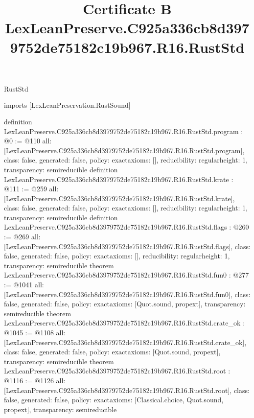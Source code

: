 \begin{lexlean}{RustStd}
\title{Certificate B LexLeanPreserve.C925a336cb8d3979752de75182c19b967.R16.RustStd}
\begin{coremodule}
imports [LexLeanPreservation.RustSound]

definition LexLeanPreserve.C925a336cb8d3979752de75182c19b967.R16.RustStd.program : @0 := @110 {
  all: [LexLeanPreserve.C925a336cb8d3979752de75182c19b967.R16.RustStd.program],
  class: false,
  generated: false,
  policy: exact{axioms: []},
  reducibility: regular{height: 1},
  transparency: semireducible
}
definition LexLeanPreserve.C925a336cb8d3979752de75182c19b967.R16.RustStd.krate : @111 := @259 {
  all: [LexLeanPreserve.C925a336cb8d3979752de75182c19b967.R16.RustStd.krate],
  class: false,
  generated: false,
  policy: exact{axioms: []},
  reducibility: regular{height: 1},
  transparency: semireducible
}
definition LexLeanPreserve.C925a336cb8d3979752de75182c19b967.R16.RustStd.flags : @260 := @269 {
  all: [LexLeanPreserve.C925a336cb8d3979752de75182c19b967.R16.RustStd.flags],
  class: false,
  generated: false,
  policy: exact{axioms: []},
  reducibility: regular{height: 1},
  transparency: semireducible
}
theorem LexLeanPreserve.C925a336cb8d3979752de75182c19b967.R16.RustStd.fun0 : @277 := @1041 {
  all: [LexLeanPreserve.C925a336cb8d3979752de75182c19b967.R16.RustStd.fun0],
  class: false,
  generated: false,
  policy: exact{axioms: [Quot.sound, propext]},
  transparency: semireducible
}
theorem LexLeanPreserve.C925a336cb8d3979752de75182c19b967.R16.RustStd.crate_ok : @1045 := @1108 {
  all: [LexLeanPreserve.C925a336cb8d3979752de75182c19b967.R16.RustStd.crate_ok],
  class: false,
  generated: false,
  policy: exact{axioms: [Quot.sound, propext]},
  transparency: semireducible
}
theorem LexLeanPreserve.C925a336cb8d3979752de75182c19b967.R16.RustStd.root : @1116 := @1126 {
  all: [LexLeanPreserve.C925a336cb8d3979752de75182c19b967.R16.RustStd.root],
  class: false,
  generated: false,
  policy: exact{axioms: [Classical.choice, Quot.sound, propext]},
  transparency: semireducible
}


\end{coremodule}
\end{lexlean}
